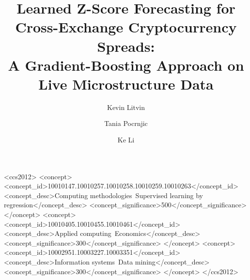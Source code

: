 \documentclass[sigconf]{acmart}
\begin{document}
\title{Learned Z-Score Forecasting for Cross-Exchange Cryptocurrency
Spreads:\\A Gradient-Boosting Approach on Live Microstructure Data}

\author{Kevin Litvin}

\author{Tania Pocrnjic}

\author{Ke Li}



\begin{CCSXML}
<ccs2012>
  <concept>
    <concept_id>10010147.10010257.10010258.10010259.10010263</concept_id>
    <concept_desc>Computing methodologies~Supervised learning by regression</concept_desc>
    <concept_significance>500</concept_significance>
  </concept>
  <concept>
    <concept_id>10010405.10010455.10010461</concept_id>
    <concept_desc>Applied computing~Economics</concept_desc>
    <concept_significance>300</concept_significance>
  </concept>
  <concept>
    <concept_id>10002951.10003227.10003351</concept_id>
    <concept_desc>Information systems~Data mining</concept_desc>
    <concept_significance>300</concept_significance>
  </concept>
</ccs2012>
\end{CCSXML}



\maketitle









\end{document}

